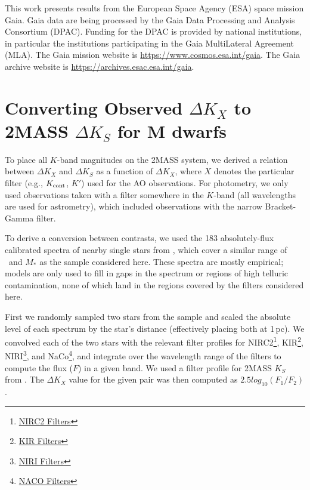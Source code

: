 \documentclass[twocolumn]{aastex62}
\begin{document}
This work presents results from the European Space Agency (ESA) space mission Gaia. Gaia data are being processed by the Gaia Data Processing and Analysis Consortium (DPAC). Funding for the DPAC is provided by national institutions, in particular the institutions participating in the Gaia MultiLateral Agreement (MLA). The Gaia mission website is \href{https://www.cosmos.esa.int/gaia}{https://www.cosmos.esa.int/gaia}. The Gaia archive website is \href{https://archives.esac.esa.int/gaia}{https://archives.esac.esa.int/gaia}.









\clearpage

\appendix 
\section{Converting Observed $\Delta K_X$ to 2MASS $\Delta K_S$ for M dwarfs} \label{sec:a1}
To place all $K$-band magnitudes on the 2MASS system, we derived a relation between $\Delta K_X$ and $\Delta K_S$ as a function of $\Delta K_X$, where $X$ denotes the particular filter (e.g., $K_{\rm{cont}}$, $K'$) used for the AO observations. For photometry, we only used observations taken with a filter somewhere in the $K$-band (all wavelengths are used for astrometry), which included observations with the narrow Bracket-Gamma filter. 

To derive a conversion between contrasts, we used the 183 absolutely-flux calibrated spectra of nearby single stars from \citet{Mann2015b}, which cover a similar range of \teff\ and $M_*$ as the sample considered here. These spectra are mostly empirical; models are only used to fill in gaps in the spectrum or regions of high telluric contamination, none of which land in the regions covered by the filters considered here.

First we randomly sampled two stars from the sample and scaled the absolute level of each spectrum by the star's distance (effectively placing both at 1\,pc). We convolved each of the two stars with the relevant filter profiles for NIRC2\footnote{\href{https://www2.keck.hawaii.edu/inst/nirc2/filters.html}{NIRC2 Filters}}, KIR\footnote{\href{http://www.cfht.hawaii.edu/Instruments/Filters/kir.html}{KIR Filters}}, NIRI\footnote{\href{http://www.gemini.edu/sciops/instruments/niri/imaging/filters}{NIRI Filters}}, and NaCo\footnote{\href{http://www.eso.org/sci/facilities/paranal/instruments/naco/inst/filters.html}{NACO Filters}}, and integrate over the wavelength range of the filters to compute the flux ($F$) in a given band. We used a filter profile for 2MASS $K_S$ from \citet{2003AJ....126.1090C}. The $\Delta K_X$ value for the given pair was then computed as $2.5log_{10}(F_1/F_2)$. 
\end{document}
